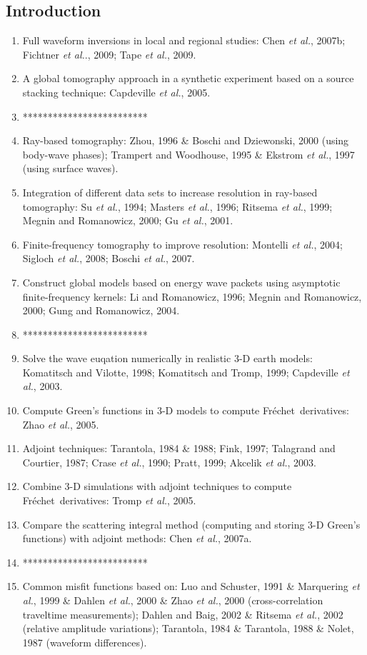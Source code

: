\documentclass{article}
\newcommand{\sline}{*************************}
\newcommand{\Frechet}{Fr\'{e}chet~}
\newcommand{\etal}{\textit{et al.}}
\begin{document}
\subsection{Introduction}
\begin{enumerate}[\hspace{10mm}*]
  \item Full waveform inversions in local and regional studies: Chen \etal, 2007b; Fichtner \etal., 2009; Tape \etal, 2009.
  \item A global tomography approach in a synthetic experiment based on a source stacking technique: Capdeville \etal, 2005.
  \item \sline
  \item Ray-based tomography: Zhou, 1996 \& Boschi and Dziewonski, 2000 (using body-wave phases); Trampert and Woodhouse, 1995 \& Ekstrom \etal, 1997 (using surface waves).
  \item Integration of different data sets to increase resolution in ray-based tomography: Su \etal, 1994; Masters \etal, 1996; Ritsema \etal, 1999; Megnin and Romanowicz, 2000; Gu \etal, 2001.
  \item Finite-frequency tomography to improve resolution: Montelli \etal, 2004; Sigloch \etal, 2008; Boschi \etal, 2007.
  \item Construct global models based on energy wave packets using asymptotic finite-frequency kernels: Li and Romanowicz, 1996; Megnin and Romanowicz, 2000; Gung and Romanowicz, 2004.
  \item \sline
  \item Solve the wave euqation numerically in realistic 3-D earth models: Komatitsch and Vilotte, 1998; Komatitsch and Tromp, 1999; Capdeville \etal, 2003.
  \item Compute Green's functions in 3-D models to compute \Frechet derivatives: Zhao \etal, 2005.
  \item Adjoint techniques: Tarantola, 1984 \& 1988; Fink, 1997; Talagrand and Courtier, 1987; Crase \etal, 1990; Pratt, 1999; Akcelik \etal, 2003.
  \item Combine 3-D simulations with adjoint techniques to compute \Frechet derivatives: Tromp \etal, 2005.
  \item Compare the scattering integral method (computing and storing 3-D Green's functions) with adjoint methods: Chen \etal, 2007a.
  \item \sline
  \item Common misfit functions based on: Luo and Schuster, 1991 \& Marquering \etal, 1999 \& Dahlen \etal, 2000 \& Zhao \etal, 2000 (cross-correlation traveltime measurements); Dahlen and Baig, 2002 \& Ritsema \etal, 2002 (relative amplitude variations); Tarantola, 1984 \& Tarantola, 1988 \& Nolet, 1987 (waveform differences).

\end{enumerate}
\end{document}
